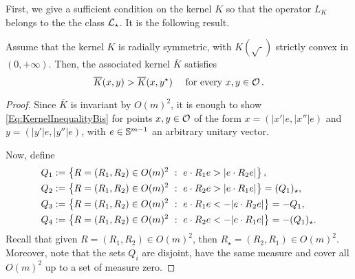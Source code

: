 First, we give a sufficient condition on the kernel $K$ so that the operator $L_K$ belongs to the the class $\mathcal{L}_\star$. It is the following result.

\begin{proposition}
\label{Prop:KernelInequalitySufficientCondition} 
Assume that the kernel $K$ is radially symmetric, with $K(\sqrt{\cdot})$ strictly convex in $(0,+\infty)$. Then, the associated kernel $\overline{K}$ satisfies
	\begin{equation}
	\label{Eq:KernelInequalityBis}
	\overline{K}(x,y) > \overline{K}(x, y^\star) \quad \text{ for every }x,y \in \mathcal{O}\,.
	\end{equation}
\end{proposition}

\begin{proof}
Since $\overline{K}$ is invariant by $O(m)^2$, it is enough to show \eqref{Eq:KernelInequalityBis} for points $x, y\in \mathcal{O}$ of the form $x = (|x'|e, |x''|e)$ and $y = (|y'|e, |y''|e)$, with $e \in \mathbb{S}^{m-1}$ an arbitrary unitary vector.

Now, define
\begin{equation}
\label{Eq:DefQ}
	\begin{split}
	Q_1 &:= \left \{ R = (R_1,R_2) \in O(m)^2 \ : \ e\cdot R_1 e > |e\cdot R_2 e| \right \},\\
	Q_2 &:= \left \{ R = (R_1,R_2) \in O(m)^2 \ : \ e\cdot R_2 e > |e\cdot R_1 e| \right \} = (Q_1)_\star,\\
	Q_3 &:= \left \{ R = (R_1,R_2) \in O(m)^2 \ : \ e\cdot R_1 e < -|e\cdot R_2 e| \right \} = -Q_1,\\
	Q_4 &:= \left \{ R = (R_1,R_2) \in O(m)^2 \ : \ e\cdot R_2 e < - |e\cdot R_1 e| \right \} = -(Q_1)_\star.
	\end{split}
\end{equation}
Recall that given $R=(R_1,R_2)\in O(m)^2$, then $R_\star=(R_2,R_1)\in O(m)^2$. Moreover, note that the sets $Q_i$ are disjoint, have the same measure and cover all $O(m)^2$ up to a set of measure zero. 


\end{proof}
